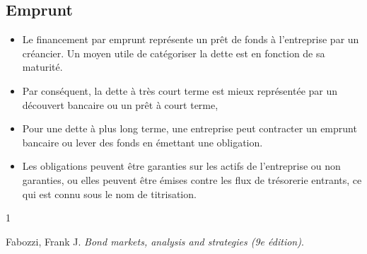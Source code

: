 \documentclass[letterpaper, 12pt]{article}
\newcommand{\1}{\mathds{1}}	%
\theoremstyle{definition}
\begin{document}
\subsection{Emprunt}
\begin{itemize}
\item Le financement par emprunt représente un prêt de fonds à l'entreprise par un créancier. Un moyen utile de catégoriser la dette est en fonction de sa maturité. 
\item Par conséquent, la dette à très court terme est mieux représentée par un découvert bancaire ou un prêt à court terme,
\item Pour une dette à plus long terme, une entreprise peut contracter un emprunt bancaire ou lever des fonds en émettant une obligation. 
\item Les obligations peuvent être garanties sur les actifs de l'entreprise ou non garanties, ou elles peuvent être émises contre les flux de trésorerie entrants, ce qui est connu sous le nom de titrisation.
\end{itemize}


\begin{thebibliography}{1}

   Fabozzi, Frank J.
   \textit{Bond markets, analysis and strategies (9e édition)}.
 


\end{thebibliography}

\end{document}
